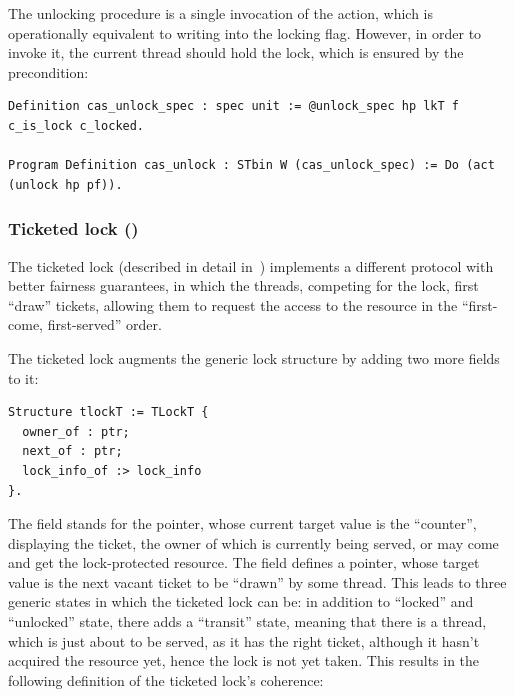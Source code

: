 The unlocking procedure is a single invocation of the 
action, which is operationally equivalent to writing into the locking
flag. However, in order to invoke it, the current thread should hold
the lock, which is ensured by the precondition:

\begin{lstlisting}
Definition cas_unlock_spec : spec unit := @unlock_spec hp lkT f c_is_lock c_locked.

Program Definition cas_unlock : STbin W (cas_unlock_spec) := Do (act (unlock hp pf)).  
\end{lstlisting}

\subsubsection{Ticketed lock ()}
\label{sec:ticketed-lock}

The ticketed lock (described in detail
in~\cite[Appendix~E]{Nanevski-al:ESOP14}) implements a different
protocol with better fairness guarantees, in which the threads,
competing for the lock, first ``draw'' tickets, allowing them to
request the access to the resource in the ``first-come, first-served''
order.

The ticketed lock augments the generic lock structure 
by adding two more fields to it:

\begin{lstlisting}
Structure tlockT := TLockT {
  owner_of : ptr; 
  next_of : ptr;
  lock_info_of :> lock_info
}.  
\end{lstlisting}

The field  stands for the pointer, whose current target
value is the ``counter'', displaying the ticket, the owner of which is
currently being served, or may come and get the lock-protected
resource. The field  defines a pointer, whose target
value is the next vacant ticket to be ``drawn'' by some thread. This
leads to three generic states in which the ticketed lock can be: in
addition to ``locked'' and ``unlocked'' state, there adds a
``transit'' state, meaning that there is a thread, which is just about
to be served, as it has the right ticket, although it hasn't acquired
the resource yet, hence the lock is not yet taken. This results in
the following definition of the ticketed lock's coherence:

